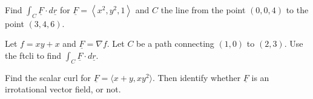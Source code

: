 \documentclass[12pt,letterpaper,noanswers]{exam}
\newcommand{\mb}[1]{\underline{#1}}
\begin{document}
 \pdfpageheight 11in 
  \pdfpagewidth 8.5in



\begin{questions}
\question Find $\displaystyle\int_C \mb F\cdot d\mb r$ for $\mb F = \left\langle x^2, y^2, 1\right\rangle$ and $C$ the line from the point $(0,0,4)$ to the point $(3,4,6)$.

\vfill

\item 
Let $f = xy+x$ and $\mb F = \nabla f.$  Let $C$ be a path connecting $(1,0)$ to $(2,3)$.  Use the ftcli to find $\int_C \mb F \cdot d\mb r$.
\vfill

\item  Find the scalar curl for $\mb F = \langle x+y, xy^2 \rangle$.  Then identify whether $\mb F$ is an irrotational vector field, or not.

\vfill

\end{questions}
\end{document}
